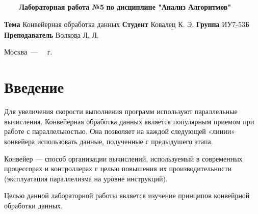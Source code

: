 \documentclass[a4paper,14pt, unknownkeysallowed]{extreport}
\begin{document}
\begin{titlepage}
	
	\begin{center}
		\noindent\begin{minipage}{1.3\textwidth}\centering
		\Large\textbf{   ~~~ Лабораторная работа №5}\newline
		\textbf{по дисциплине "Анализ Алгоритмов"}\newline\newline\newline
		\end{minipage}
	\end{center}
	
	\noindent\textbf{Тема} 			$\underline{\text{Конвейерная обработка данных}}$\newline\newline
	\noindent\textbf{Студент} 		$\underline{\text{Ковалец К. Э.}}$\newline\newline
	\noindent\textbf{Группа} 		$\underline{\text{ИУ7-53Б}}$\newline\newline
	\noindent\textbf{Преподаватель} $\underline{\text{Волкова Л. Л.}}$\newline
	
	\begin{center}
		\vfill
		Москва~---~\the\year
		~г.
	\end{center}
	\restoregeometry
\end{titlepage}



\renewcommand{\contentsname}{Содержание} 
\tableofcontents
\setcounter{page}{2}





\chapter*{Введение}

Для увеличения скорости выполнения программ используют параллельные вычисления. Конвейерная обработка данных является популярным приемом при работе с параллельностью. Она позволяет на каждой следующей «линии» конвейера использовать данные, полученные с предыдушего этапа.

Конвейер — способ организации вычислений, используемый в современных процессорах и контроллерах с целью повышения их производительности (эксплуатация параллелизма на уровне инструкций).

Целью данной лабораторной работы является изучение принципов конвейрной обработки данных.
\end{document}
